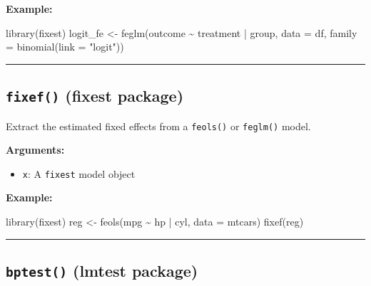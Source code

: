 \documentclass[
  letterpaper,
  DIV=11,
  numbers=noendperiod]{scrreprt}
\newenvironment{Shaded}{\begin{snugshade}}{\end{snugshade}}
\newcommand{\AttributeTok}[1]{\textcolor[rgb]{0.40,0.45,0.13}{#1}}
\newcommand{\FunctionTok}[1]{\textcolor[rgb]{0.28,0.35,0.67}{#1}}
\newcommand{\NormalTok}[1]{\textcolor[rgb]{0.00,0.23,0.31}{#1}}
\newcommand{\OtherTok}[1]{\textcolor[rgb]{0.00,0.23,0.31}{#1}}
\newcommand{\SpecialCharTok}[1]{\textcolor[rgb]{0.37,0.37,0.37}{#1}}
\newcommand{\StringTok}[1]{\textcolor[rgb]{0.13,0.47,0.30}{#1}}
\providecommand{\tightlist}{%
  \setlength{\itemsep}{0pt}\setlength{\parskip}{0pt}}
\begin{document}
\textbf{Example:}

\begin{Shaded}
\begin{Highlighting}[]
\FunctionTok{library}\NormalTok{(fixest)}
\NormalTok{logit\_fe }\OtherTok{\textless{}{-}} \FunctionTok{feglm}\NormalTok{(outcome }\SpecialCharTok{\textasciitilde{}}\NormalTok{ treatment }\SpecialCharTok{|}\NormalTok{ group, }\AttributeTok{data =}\NormalTok{ df, }\AttributeTok{family =} \FunctionTok{binomial}\NormalTok{(}\AttributeTok{link =} \StringTok{"logit"}\NormalTok{))}
\end{Highlighting}
\end{Shaded}

\begin{center}\rule{0.5\linewidth}{0.5pt}\end{center}

\subsection{\texorpdfstring{\texttt{fixef()} (fixest
package)}{fixef() (fixest package)}}\label{fixef-fixest-package}

Extract the estimated fixed effects from a \texttt{feols()} or
\texttt{feglm()} model.

\textbf{Arguments:}

\begin{itemize}
\tightlist
\item
  \texttt{x}: A \texttt{fixest} model object
\end{itemize}

\textbf{Example:}

\begin{Shaded}
\begin{Highlighting}[]
\FunctionTok{library}\NormalTok{(fixest)}
\NormalTok{reg }\OtherTok{\textless{}{-}} \FunctionTok{feols}\NormalTok{(mpg }\SpecialCharTok{\textasciitilde{}}\NormalTok{ hp }\SpecialCharTok{|}\NormalTok{ cyl, }\AttributeTok{data =}\NormalTok{ mtcars)}
\FunctionTok{fixef}\NormalTok{(reg)}
\end{Highlighting}
\end{Shaded}

\begin{center}\rule{0.5\linewidth}{0.5pt}\end{center}

\subsection{\texorpdfstring{\texttt{bptest()} (lmtest
package)}{bptest() (lmtest package)}}\label{bptest-lmtest-package}
\end{document}
